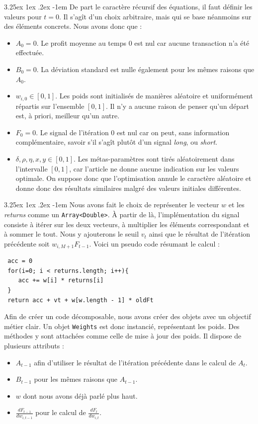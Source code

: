 \documentclass[a4paper, 11pt]{article}
\makeatletter
\renewcommand\paragraph{\@startsection{paragraph}{5}{\z@}%
  {3.25ex \@plus1ex \@minus.2ex}%
  {-1em}%
  {\normalfont\normalsize\bfseries}}
\makeatother
\begin{document}
\paragraph{}
De part le caractère récursif des équations, il faut définir les valeurs pour $t=0$. Il s'agît d'un choix arbitraire, mais qui se base néanmoins sur des
éléments concrets. Nous avons donc que :
\begin{itemize}
 \item $A_0 = 0$. Le profit moyenne au temps $0$ est nul car aucune transaction n'a été effectuée.
 \item $B_0 = 0$. La déviation standard est nulle également pour les mêmes raisons que $A_0$.
 \item $w_{i,0} \in [0,1]$. Les poids sont initialisés de manières aléatoire et uniformément répartis sur l'ensemble $[0,1]$. Il n'y a aucune raison
 de penser qu'un départ est, à priori, meilleur qu'un autre.
 \item $F_0 = 0$. Le signal de l'itération 0 est nul car on peut, sans information complémentaire, savoir s'il s'agît plutôt d'un signal \textit{long}, ou
 \textit{short}.
 \item $\delta,\rho,\eta,x,y \in [0,1]$. Les métas-paramètres sont tirés aléatoirement dans l'intervalle $[0,1]$, car l'article ne donne aucune
 indication sur les valeurs optimale. On suppose donc que l'optimisation annule le caractère aléatoire et donne donc des résultats similaires malgré des
 valeurs initiales différentes.
\end{itemize}

\paragraph{}
Nous avons fait le choix de représenter le vecteur $w$ et les \textit{returns} comme un \texttt{Array<Double>}. À partir de là, l'implémentation du signal
consiste à itérer sur les deux vecteurs, à multiplier les éléments correspondant et à sommer le tout. Nous y ajouterons le seuil $v_t$ ainsi que le 
résultat de l'itération précédente soit $w_{i,M+1} F_{t-1}$.
Voici un pseudo code résumant le calcul :
\begin{lstlisting}
 acc = 0
 for(i=0; i < returns.length; i++){
    acc += w[i] * returns[i]
 }
 return acc + vt + w[w.length - 1] * oldFt
\end{lstlisting}

Afin de créer un code décomposable, nous avons créer des objets avec un objectif métier clair. Un objet \texttt{Weights} est donc instancié, représentant
les poids. Des méthodes y sont attachées comme celle de mise à jour des poids. Il dispose de plusieurs attributs :
\begin{itemize}
 \item $A_{t-1}$ afin d'utiliser le résultat de l'itération précédente dans le calcul de $A_t$.
 \item $B_{t-1}$ pour les mêmes raisons que $A_{t-1}$.
 \item $w$ dont nous avons déjà parlé plus haut.
 \item $\frac{dF_{t-1}}{dw_{i,t-1}}$ pour le calcul de $\frac{dF_{t}}{dw_{i,t}}$.
\end{itemize}
\end{document}

